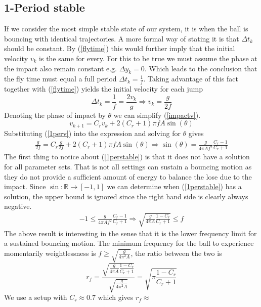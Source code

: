 \documentclass[12pt,oneside,a4paper]{article}
\numberwithin{equation}{section}
\begin{document}
{{{{\subsection{1-Period stable}
If we consider the most simple stable state of our system, it is when the ball is bouncing with identical trajectories. A more formal way of stating it is that $\Delta t_k$ should be constant. By  (\ref{flytime}) this would further imply that the initial velocity $v_k$ is the same for every. For this to be true we must assume the phase at the impact also remain constant e.g. $\Delta y_k=0$. Which leads to the conclusion that the fly time must equal a full period $\Delta t_k = \frac{1}{f}$. Taking advantage of this fact together with (\ref{flytime}) yields the initial velocity for each jump
\begin{equation}
	\Delta t_k = \frac{1}{f} = \frac{2v_k}{g} \Rightarrow v_k = \frac{g}{2f}
	\label{1perv}
\end{equation}
Denoting the phase of impact by $\theta$ we can simplify (\ref{impactv}).
\begin{equation}
	v_{k+1} = C_rv_k+2(C_r+1)\pi fA \sin(\theta)
\end{equation}
Substituting (\ref{1perv}) into the expression and solving for $\theta$ gives
\begin{align}
	\frac{g}{2f} = C_r\frac{g}{2f}+2(C_r+1)\pi fA \sin(\theta) \Rightarrow \sin(\theta) = \frac{g}{4\pi Af^2 }\frac{C_r-1}{C_r+1}
	\label{1perstable}
\end{align}
The first thing to notice about (\ref{1perstable}) is that it does not have a solution for all parameter sets. That is not all settings can sustain a bouncing motion as they do not provide a sufficient amount of energy to balance the lose due to the impact. Since $\sin: \mathbb{R} \rightarrow [-1,1]$ we can determine when (\ref{1perstable}) has a solution, the upper bound is ignored since the right hand side is clearly always negative.
\begin{align}
	-1 \le \frac{g}{4\pi Af^2 }\frac{C_r-1}{C_r+1} \Rightarrow \sqrt{\frac{g}{4\pi A}\frac{1-C_r}{C_r+1}} \le f
\end{align}
The above result is interesting in the sense that it is the lower frequency limit for a sustained bouncing motion. The minimum frequency for the ball to experience momentarily weightlessness is $f\ge\sqrt{\frac{g}{4\pi^2A}}$, the ratio between the two is
\begin{equation}
	r_f=\frac{\sqrt{\frac{g}{4\pi A}\frac{1-C_r}{C_r+1}}}{\sqrt{\frac{g}{4\pi^2A}}} = \sqrt{\pi \frac{1-C_r}{C_r+1}}
\end{equation}
We use a setup with $C_r\approx 0.7$ which gives $r_f\approx$

}}}}
\end{document}
